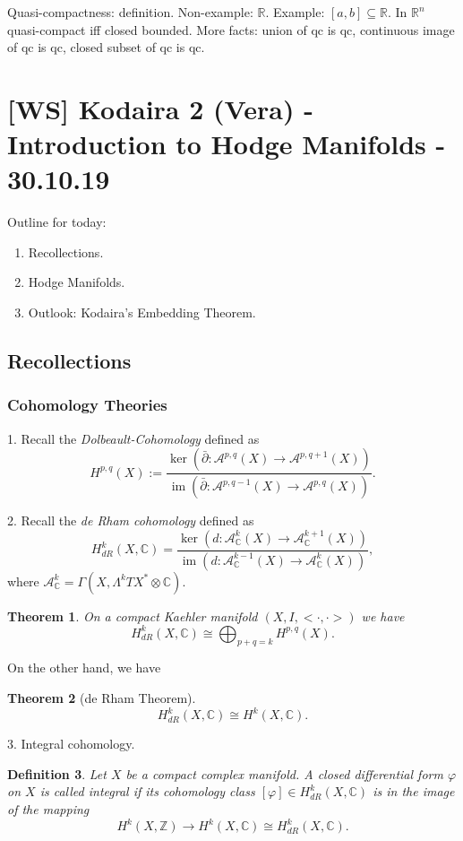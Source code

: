 \documentclass[12pt]{article}
\theoremstyle{darkgreentheorem}
\newtheorem{thm}{Theorem}[section]
\theoremstyle{darkbluedefinition}
\newtheorem{defn}[thm]{Definition}
\theoremstyle{darkredexample}
\theoremstyle{remark}
\newcommand{\Z}{\mathbb{Z}}
\newcommand{\R}{\mathbb{R}}
\newcommand{\1}{\mathbbm{1}}
\newcommand{\C}{\mathbb{C}}
\newcommand{\A}{\mathscr{A}}
\DeclareMathOperator{\im}{im}
\newcommand{\ot}{\otimes}
\begin{document}
Quasi-compactness: definition.
Non-example: $\R$.
Example: $[a,b]\subseteq \R$.
In $\R^{n}$ quasi-compact iff closed bounded.
More facts: union of qc is qc, continuous image of qc is qc, closed subset of qc is qc.

\section{[WS] Kodaira 2 (Vera) - Introduction to Hodge Manifolds - 30.10.19}

Outline for today:
\begin{enumerate}[label=\arabic*)]
    \item Recollections.
    \item Hodge Manifolds.
    \item Outlook: Kodaira's Embedding Theorem.
\end{enumerate}

\subsection{Recollections}

\subsubsection{Cohomology Theories}

1. Recall the \textit{Dolbeault-Cohomology} defined as
\[ H^{p,q}(X):=\frac{\ker(\bar{\partial}\colon \A^{p,q}(X)\to \A^{p,q+1}(X))}{\im(\bar{\partial}\colon \A^{p,q-1}(X)\to \A^{p,q}(X))}.\]

2. Recall the \textit{de Rham cohomology} defined as
\[ H_{dR}^{k}(X,\C)=\frac{\ker(d\colon \A_{\C}^{k}(X)\to \A_{\C}^{k+1}(X))}{\im(d\colon \A_{\C}^{k-1}(X)\to \A_{\C}^{k}(X))}, \]
where $\A_{\C}^{k}=\Gamma(X,\Lambda^{k}TX^{*}\ot \C)$.

\begin{thm}
    On a compact Kaehler manifold $(X,I,<\cdot,\cdot>)$ we have
    \[ H_{dR}^{k}(X,\C)\cong \bigoplus_{p+q=k}H^{p,q}(X).\]
\end{thm}

On the other hand, we have

\begin{thm}[de Rham Theorem]
    \[ H_{dR}^{k}(X,\C)\cong H^{k}(X,\C).\]
\end{thm}

3. Integral cohomology.

\begin{defn}
    Let $X$ be a compact complex manifold.
    A closed differential form $\varphi$ on $X$ is called \textit{integral} if its cohomology class $[\varphi]\in H^{k}_{dR}(X,\C)$ is in the image of the mapping
    \[ H^{k}(X,\Z)\to H^{k}(X,\C)\cong H_{dR}^{k}(X,\C). \]
\end{defn}
\end{document}
